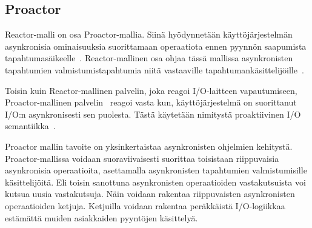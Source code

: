 \documentclass[finnish]{tktltiki2}
\theoremstyle{definition}
\theoremstyle{remark}
\begin{document}
\subsection{Proactor}

Reactor-malli on osa Proactor-mallia.
Siinä hyödynnetään käyttöjärjestelmän asynkronisia ominaisuuksia suorittamaan
operaatiota ennen pyynnön saapumista tapahtumasäikeelle~\cite{hu_applying_1998}.
Reactor-mallinen osa ohjaa tässä mallissa asynkronisten tapahtumien
valmistumistapahtumia niitä vastaaville tapahtumankäsittelijöille~\cite{pyarali_proactor_1997}.

Toisin kuin Reactor-mallinen palvelin, joka reagoi I/O-laitteen vapautumiseen,
Proactor-mallinen palvelin~\cite{hu_applying_1998} reagoi vasta kun, käyttöjärjestelmä
on suorittanut I/O:n asynkronisesti sen puolesta. Tästä käytetään nimitystä
proaktiivinen I/O semantiikka~\cite{schmidt_reactor:_1995}.

Proactor mallin tavoite on yksinkertaistaa asynkronisten ohjelmien kehitystä.
Proactor-mallissa voidaan suoraviivaisesti suorittaa toisistaan riippuvaisia
asynkronisia operaatioita, asettamalla asynkronisten tapahtumien valmistumisille
käsittelijöitä. Eli toisin sanottuna asynkronisten operaatioiden vastakutsuista
voi kutsua uusia vastakutsuja. Näin voidaan rakentaa riippuvaisten
asynkronisten operaatioiden ketjuja. Ketjuilla voidaan
rakentaa peräkkäistä I/O-logiikkaa estämättä muiden asiakkaiden
pyyntöjen käsittelyä.
\end{document}

